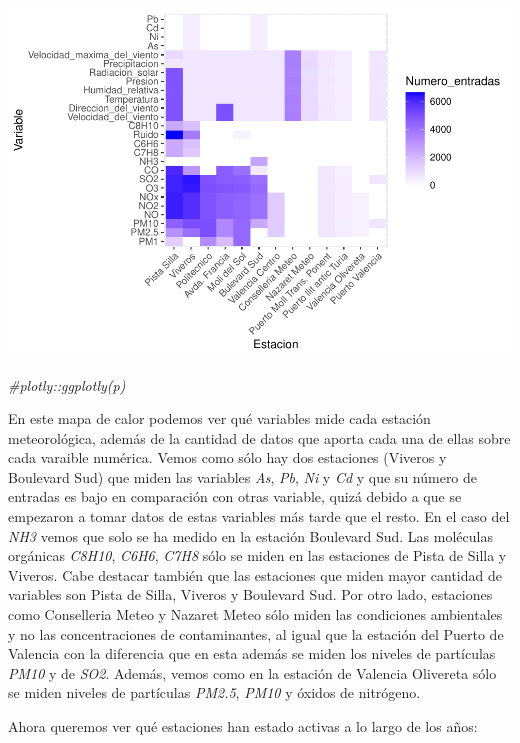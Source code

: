 \documentclass[notspecified,article,submit,moreauthors,pdftex]{Definitions/mdpi}
\newenvironment{Shaded}{\begin{snugshade}}{\end{snugshade}}
\newcommand{\CommentTok}[1]{\textcolor[rgb]{0.56,0.35,0.01}{\textit{#1}}}
\begin{document}
\includegraphics{Memoria_files/figure-latex/unnamed-chunk-10-1.pdf}

\begin{Shaded}
\begin{Highlighting}[]
\CommentTok{\#plotly::ggplotly(p)}
\end{Highlighting}
\end{Shaded}

En este mapa de calor podemos ver qué variables mide cada estación
meteorológica, además de la cantidad de datos que aporta cada una de
ellas sobre cada varaible numérica. Vemos como sólo hay dos estaciones
(Viveros y Boulevard Sud) que miden las variables \emph{As}, \emph{Pb},
\emph{Ni} y \emph{Cd} y que su número de entradas es bajo en comparación
con otras variable, quizá debido a que se empezaron a tomar datos de
estas variables más tarde que el resto. En el caso del \emph{NH3} vemos
que solo se ha medido en la estación Boulevard Sud. Las moléculas
orgánicas \emph{C8H10}, \emph{C6H6}, \emph{C7H8} sólo se miden en las
estaciones de Pista de Silla y Viveros. Cabe destacar también que las
estaciones que miden mayor cantidad de variables son Pista de Silla,
Viveros y Boulevard Sud. Por otro lado, estaciones como Conselleria
Meteo y Nazaret Meteo sólo miden las condiciones ambientales y no las
concentraciones de contaminantes, al igual que la estación del Puerto de
Valencia con la diferencia que en esta además se miden los niveles de
partículas \emph{PM10} y de \emph{SO2}. Además, vemos como en la
estación de Valencia Olivereta sólo se miden niveles de partículas
\emph{PM2.5}, \emph{PM10} y óxidos de nitrógeno.

Ahora queremos ver qué estaciones han estado activas a lo largo de los
años:
\end{document}
